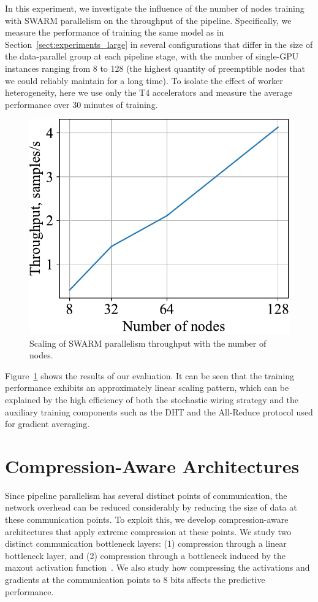 In this experiment, we investigate the influence of the number of nodes training with SWARM parallelism on the throughput of the pipeline. Specifically, we measure the performance of training the same model as in Section~\ref{sect:experiments_large} in several configurations that differ in the size of the data-parallel group at each pipeline stage, with the number of single-GPU instances ranging from 8 to 128 (the highest quantity of preemptible nodes that we could reliably maintain for a long time). To isolate the effect of worker heterogeneity, here we use only the T4 accelerators and measure the average performance over 30 minutes of training.

\begin{figure}[b]
    \centering
    \includegraphics[width=0.7\linewidth]{resources/scaling_t4.pdf}
    \caption{Scaling of SWARM parallelism throughput with the number of nodes.}
    \label{fig:scaling_t4}
\end{figure}


Figure~\ref{fig:scaling_t4} shows the results of our evaluation. It can be seen that the training performance exhibits an approximately linear scaling pattern, which can be explained by the high efficiency of both the stochastic wiring strategy and the auxiliary training components such as the DHT and the All-Reduce protocol used for gradient averaging.

\section{Compression-Aware Architectures}\label{appendix:compression}

Since pipeline parallelism has several distinct points of communication, the network overhead can be reduced considerably by reducing the size of data at these communication points. To exploit this, we develop compression-aware architectures that apply extreme compression at these points. We study two distinct communication bottleneck layers: (1) compression through a linear bottleneck layer, and (2) compression through a bottleneck induced by the maxout activation function~\citep{goodfellow2013maxout}. We also study how compressing the activations and gradients at the communication points to 8 bits affects the predictive performance.

